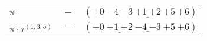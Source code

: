\begin{example}\label{example:HFLGUNSS}
  \hfill
  \begin{\position}
    \begin{tabular}{lll}
      $\pi$ & $=$ & $({+0}~\underline{{-4}~{-3}}~\underline{{+1}~{+2}}~{+5}~{+6})$ \\
      $\pi \cdot \tau^{(1,3,5)}$ & $=$ & $({+0}~\underline{{+1}~{+2}}~\underline{{-4}~{-3}}~{+5}~{+6})$ \\
    \end{tabular}
  \end{\position}
\end{example}